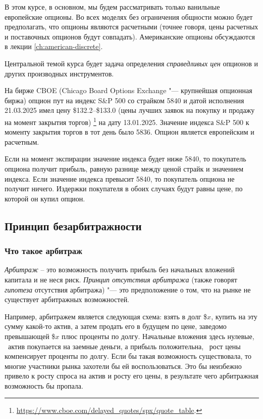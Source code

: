 В этом курсе, в основном, мы будем рассматривать только ванильные европейские опционы.
Во всех моделях без ограничения общности можно будет предполагать, что опционы являются расчетными (точнее говоря, цены расчетных и поставочных опционов будут совпадать).
Американские опционы обсуждаются в лекции \ref{ch:american-discrete}.

Центральной темой курса будет задача определения \emph{справедливых цен} опционов и других производных инструментов. 

\begin{example}
На бирже CBOE (Chicago Board Options Exchange "--- крупнейшая опционная биржа) опцион пут на индекс S\&P 500 со страйком 5840 и датой исполнения 21.03.2025 имел цену \$132.2--\$133.0 (цены лучших заявок на покупку и продажу на момент закрытия торгов)%
\footnote{\url{https://www.cboe.com/delayed_quotes/spx/quote_table}.} на дату 13.01.2025.
Значение индекса S\&P 500 к моменту закрытия торгов в тот день было 5836.
Опцион является европейским и расчетным. 

Если на момент экспирации значение индекса будет ниже 5840, то покупатель опциона получит прибыль, равную разнице между ценой страйк и значением индекса. Если значение индекса превысит 5840, то покупатель опциона не получит ничего. Издержки покупателя в обоих случаях будут равны цене, по которой он купил опцион.
\end{example}




\subsection{Принцип безарбитражности}
\subsubsection{Что такое арбитраж}

\emph{Арбитраж} -- это возможность получить прибыль без начальных вложений капитала и не неся риск. 
\emph{Принцип отсутствия арбитража} (также говорят \emph{гипотеза} отсутствия арбитража) "--- это предположение о том, что на рынке не существует арбитражных возможностей. 

Например, арбитражем является следующая схема: взять в долг \${$x$}, купить на эту сумму какой-то актив, а затем продать его в будущем по цене, заведомо превышающей \${$x$} плюс проценты по долгу.
Начальные вложения здесь нулевые, \tk\ актив покупается на заемные деньги, а прибыль положительна, \tk\ рост цены компенсирует проценты по долгу. 
Если бы такая возможность существовала, то многие участники рынка захотели бы ей воспользоваться.
Это бы неизбежно привело к росту спроса на актив и росту его цены, в результате чего арбитражная возможность бы пропала. 

